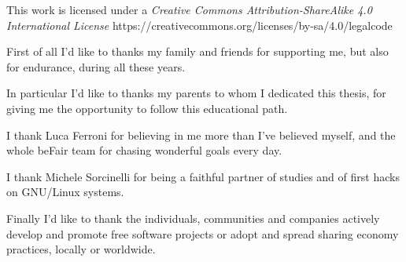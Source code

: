 \documentclass[a4paper,twoside,11pt]{report}
\begin{document}

\copertinatesi
{}
\indice
\indicefigure
\indicetabelle
\iniziatesto

This work is licensed under a \textit{Creative Commons Attribution-ShareAlike 4.0 International License} https://creativecommons.org/licenses/by-sa/4.0/legalcode









\appendix




\ringraziamenti
First of all I'd like to thanks my family and friends for supporting me, but also for endurance, during all these years.

In particular I'd like to thanks my parents to whom I dedicated this thesis, for giving me the opportunity to follow this educational path.

I thank Luca Ferroni for believing in me more than I've believed myself, and the whole beFair team for chasing wonderful goals every day.

I thank Michele Sorcinelli for being a faithful partner of studies and of first hacks on GNU/Linux systems.

Finally I'd like to thank the individuals, communities and companies actively develop and promote free software projects or adopt and spread sharing economy practices, locally or worldwide.
\end{document}
